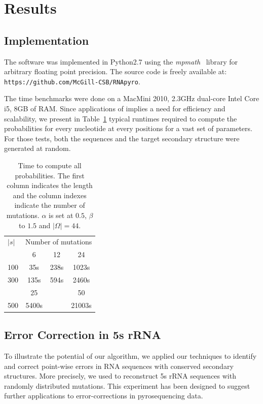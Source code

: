 \section{Results}
\label{sec:results}

\subsection{Implementation}
The software was implemented in Python2.7 using the \textit{mpmath}~\cite{mpmath} library
for  arbitrary floating point precision. The source code is freely available at: \\\hfill\verb+https://github.com/McGill-CSB/RNApyro+.

The time benchmarks were done on a MacMini 2010, 2.3GHz dual-core Intel Core i5, 8GB of RAM.
Since applications of \RNApyro implies a need for
 efficiency and scalability, we present in Table~\ref{tab:time} typical runtimes required to compute the probabilities for  every nucleotide at every positions for a vast set of parameters. For those tests,
 both the sequences and the target secondary structure were generated at random.

\begin{table}[t]
\begin{center}
\begin{tabular}{lccc}
$|s|$&\multicolumn{3}{c}{Number of mutations}\\\cline{2-4}
		 			  & 6   &  12  & 24\\\cline{2-4}
100  				& 35s  & 238s & 1023s\\
300  			& 135s & 594s &2460s\\\cline{2-4}
		 						& 25   &    &	50		\\\cline{2-4}
500         & 5400s&       &  21003s    \\
\end{tabular}
\end{center}
\caption{Time to compute all probabilities. The first column indicates the length and  the column indexes indicate the number
 of mutations. $\alpha$ is
set at $0.5$,  $\beta$ to $1.5$ and $|\Omega|=44$.}
\label{tab:time}
\end{table}


\subsection{Error Correction in 5s rRNA}

To illustrate the potential of our algorithm, we applied our techniques to identify and correct point-wise errors in RNA sequences
with conserved secondary structures. More precisely, we used \RNApyro to reconstruct 5s rRNA sequences with randomly distributed
mutations. This experiment has been designed to suggest further applications to error-corrections in pyrosequencing data.

